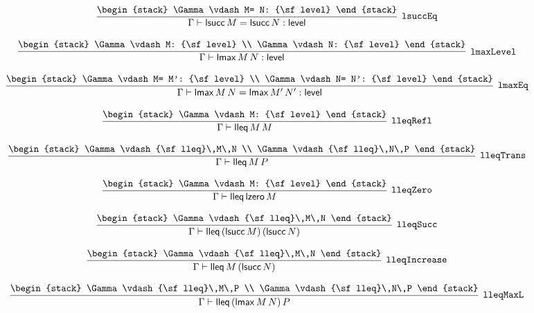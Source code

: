 \[
\infer[{\tt lsuccEq}]{\Gamma \vdash {\sf lsucc}\,M= {\sf lsucc}\,N: {\sf level}}{
\begin{stack}
\Gamma \vdash M= N: {\sf level}
\end{stack}}
\]

\[
\infer[{\tt lmaxLevel}]{\Gamma \vdash {\sf lmax}\,M\,N: {\sf level}}{
\begin{stack}
\Gamma \vdash M: {\sf level}
\\
\Gamma \vdash N: {\sf level}
\end{stack}}
\]

\[
\infer[{\tt lmaxEq}]{\Gamma \vdash {\sf lmax}\,M\,N= {\sf lmax}\,M'\,N': {\sf level}}{
\begin{stack}
\Gamma \vdash M= M': {\sf level}
\\
\Gamma \vdash N= N': {\sf level}
\end{stack}}
\]

\[
\infer[{\tt lleqRefl}]{\Gamma \vdash {\sf lleq}\,M\,M}{
\begin{stack}
\Gamma \vdash M: {\sf level}
\end{stack}}
\]

\[
\infer[{\tt lleqTrans}]{\Gamma \vdash {\sf lleq}\,M\,P}{
\begin{stack}
\Gamma \vdash {\sf lleq}\,M\,N
\\
\Gamma \vdash {\sf lleq}\,N\,P
\end{stack}}
\]

\[
\infer[{\tt lleqZero}]{\Gamma \vdash {\sf lleq}\,{\sf lzero}\,M}{
\begin{stack}
\Gamma \vdash M: {\sf level}
\end{stack}}
\]

\[
\infer[{\tt lleqSucc}]{\Gamma \vdash {\sf lleq}\,({\sf lsucc}\,M)\,({\sf lsucc}\,N)}{
\begin{stack}
\Gamma \vdash {\sf lleq}\,M\,N
\end{stack}}
\]

\[
\infer[{\tt lleqIncrease}]{\Gamma \vdash {\sf lleq}\,M\,({\sf lsucc}\,N)}{
\begin{stack}
\Gamma \vdash {\sf lleq}\,M\,N
\end{stack}}
\]

\[
\infer[{\tt lleqMaxL}]{\Gamma \vdash {\sf lleq}\,({\sf lmax}\,M\,N)\,P}{
\begin{stack}
\Gamma \vdash {\sf lleq}\,M\,P
\\
\Gamma \vdash {\sf lleq}\,N\,P
\end{stack}}
\]

